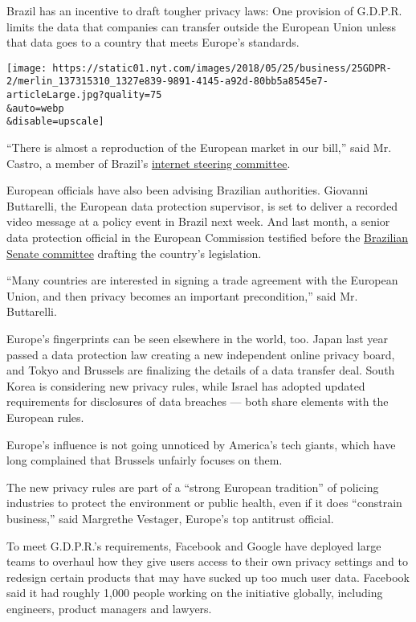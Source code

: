 Brazil has an incentive to draft tougher privacy laws: One provision of
G.D.P.R. limits the data that companies can transfer outside the
European Union unless that data goes to a country that meets Europe's
standards.

\texttt{[image: https://static01.nyt.com/images/2018/05/25/business/25GDPR-2/merlin\_137315310\_1327e839-9891-4145-a92d-80bb5a8545e7-articleLarge.jpg?quality=75\\\&auto=webp\\\&disable=upscale]}

``There is almost a reproduction of the European market in our bill,''
said Mr. Castro, a member of Brazil's
\href{https://www.cgi.br/about/}{internet steering committee}.

European officials have also been advising Brazilian authorities.
Giovanni Buttarelli, the European data protection supervisor, is set to
deliver a recorded video message at a policy event in Brazil next week.
And last month, a senior data protection official in the European
Commission testified before the
\href{https://www12.senado.leg.br/ecidadania/visualizacaoaudiencia?id=13368}{Brazilian
Senate committee} drafting the country's legislation.

``Many countries are interested in signing a trade agreement with the
European Union, and then privacy becomes an important precondition,''
said Mr. Buttarelli.

Europe's fingerprints can be seen elsewhere in the world, too. Japan
last year passed a data protection law creating a new independent online
privacy board, and Tokyo and Brussels are finalizing the details of a
data transfer deal. South Korea is considering new privacy rules, while
Israel has adopted updated requirements for disclosures of data breaches
--- both share elements with the European rules.

Europe's influence is not going unnoticed by America's tech giants,
which have long complained that Brussels unfairly focuses on them.

The new privacy rules are part of a ``strong European tradition'' of
policing industries to protect the environment or public health, even if
it does ``constrain business,'' said Margrethe Vestager, Europe's top
antitrust official.

To meet G.D.P.R.'s requirements, Facebook and Google have deployed large
teams to overhaul how they give users access to their own privacy
settings and to redesign certain products that may have sucked up too
much user data. Facebook said it had roughly 1,000 people working on the
initiative globally, including engineers, product managers and lawyers.

